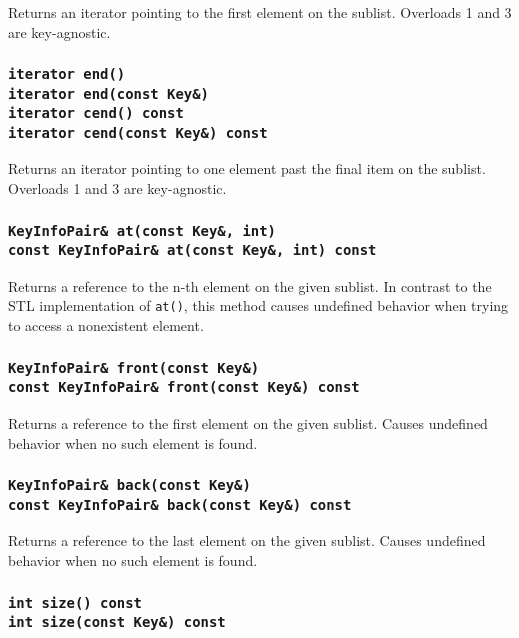 ﻿\documentclass{article}
\begin{document}
Returns an iterator pointing to the first element on the sublist. Overloads 1
and 3 are key-agnostic.

\subsubsection{{\tt iterator end()} \\
	{\tt iterator end(const Key\&)} \\
	{\tt iterator cend() const} \\
	{\tt iterator cend(const Key\&) const}}
	
Returns an iterator pointing to one element past the final item on the sublist.
Overloads 1 and 3 are key-agnostic.

\subsubsection{{\tt KeyInfoPair\& at(const Key\&, int)} \\
	{\tt const KeyInfoPair\& at(const Key\&, int) const}}
	
Returns a reference to the n-th element on the given sublist. In contrast to
the STL implementation of {\tt at()}, this method causes undefined behavior
when trying to access a nonexistent element.

\subsubsection{{\tt KeyInfoPair\& front(const Key\&)} \\
	{\tt const KeyInfoPair\& front(const Key\&) const}}
	
Returns a reference to the first element on the given sublist. Causes undefined
behavior when no such element is found.

\subsubsection{{\tt KeyInfoPair\& back(const Key\&)} \\
	{\tt const KeyInfoPair\& back(const Key\&) const}}
	
Returns a reference to the last element on the given sublist. Causes undefined
behavior when no such element is found.

\subsubsection{{\tt int size() const} \\
	{\tt int size(const Key\&) const}}
	
\end{document}
